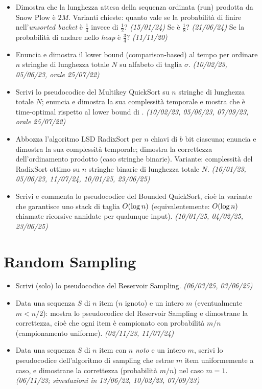 \begin{itemize}[leftmargin=1.4em]
\item {}\hot Dimostra che la lunghezza attesa della sequenza ordinata (run) prodotta da Snow Plow
\`e $2M$. Varianti chieste: quanto vale se la probabilit\`a di finire nell'\emph{unsorted bucket} \`e
$\tfrac14$ invece di $\tfrac12$? \emph{(15/01/24)} Se \`e $\tfrac18$? \emph{(21/06/24)} Se la
probabilit\`a di andare nello \emph{heap} \`e $\tfrac34$? \emph{(11/11/20)}
\item {}\hot Enuncia e dimostra il lower bound (comparison-based) al tempo per ordinare $n$
stringhe di lunghezza totale $N$ su alfabeto di taglia $\sigma$. \emph{(10/02/23, 05/06/23, orale 25/07/22)}
\item {}\hot Scrivi lo pseudocodice del Multikey QuickSort su $n$ stringhe di lunghezza totale $N$;
enuncia e dimostra la sua complessit\`a temporale e mostra che \`e time-optimal rispetto al lower
bound di . \emph{(10/02/23, 05/06/23, 07/09/23, orale 25/07/22)}
\item {}\hot Abbozza l'algoritmo LSD RadixSort per $n$ chiavi di $b$ bit ciascuna; enuncia e
dimostra la sua complessit\`a temporale; dimostra la correttezza dell'ordinamento prodotto (caso
stringhe binarie). Variante: complessit\`a del RadixSort ottimo su $n$ stringhe binarie di lunghezza
totale $N$. \emph{(16/01/23, 05/06/23, 11/07/24, 10/01/25, 23/06/25)}
\item {}\hot Scrivi e commenta lo pseudocodice del Bounded QuickSort, cio\`e la variante che
garantisce uno stack di taglia $O\!\left(\log n\right)$ (equivalentemente: $O\!\left(\log n\right)$ chiamate ricorsive
annidate per qualunque input). \emph{(10/01/25, 04/02/25, 23/06/25)}
\end{itemize}

\section{Random Sampling}

\begin{itemize}[leftmargin=1.4em]
\item {}\hot Scrivi (solo) lo pseudocodice del Reservoir Sampling. \emph{(06/03/25, 03/06/25)}
\item {}\hot Data una sequenza $S$ di $n$ item ($n$ ignoto) e un intero $m$ (eventualmente
$m<n/2$): mostra lo pseudocodice del Reservoir Sampling e dimostrane la correttezza, cio\`e che ogni
item \`e campionato con probabilit\`a $m/n$ (campionamento uniforme). \emph{(02/11/23, 11/07/24)}
\item {} Data una sequenza $S$ di $n$ item con $n$ \emph{noto} e un intero $m$, scrivi lo
pseudocodice dell'algoritmo di sampling che estrae $m$ item uniformemente a caso, e dimostrane la
correttezza (probabilit\`a $m/n$) nel caso $m=1$. \emph{(06/11/23; simulazioni in 13/06/22, 10/02/23, 07/09/23)}
\end{itemize}

